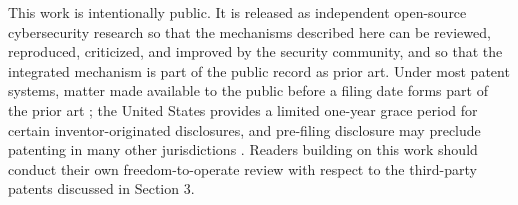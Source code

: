 \documentclass[11pt,letterpaper]{article}
\begin{document}
This work is intentionally public. It is released as independent open-source cybersecurity research so that the mechanisms described here can be reviewed, reproduced, criticized, and improved by the security community, and so that the integrated mechanism is part of the public record as prior art. Under most patent systems, matter made available to the public before a filing date forms part of the prior art \cite{epo}; the United States provides a limited one-year grace period for certain inventor-originated disclosures, and pre-filing disclosure may preclude patenting in many other jurisdictions \cite{uspto,wipo}. Readers building on this work should conduct their own freedom-to-operate review with respect to the third-party patents discussed in Section 3.
\end{document}

